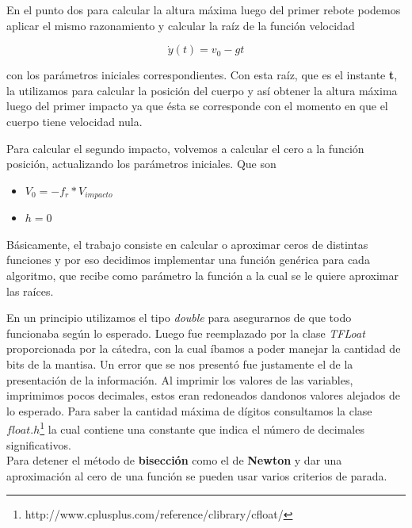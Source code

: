 \documentclass[a4paper]{article}
\begin{document}
En el punto dos para calcular la altura máxima luego del primer rebote podemos aplicar el mismo razonamiento y calcular la raíz de la función velocidad

\begin{equation}
 \dot{y}(t) = v_0 - g t
\end{equation}

con los parámetros iniciales correspondientes. Con esta raíz, que es el instante \textbf{t}, la utilizamos para calcular la posición del cuerpo y así obtener la altura máxima luego del primer impacto ya que ésta se corresponde con el momento en que el cuerpo tiene velocidad nula.\\ \hspace{1em}

Para calcular el segundo impacto, volvemos a calcular el cero a la función posición,  actualizando los parámetros iniciales. Que son 

\begin{itemize}
 	\item $V_0 = -f_r *V_{impacto} $
	\item $h = 0$ 
\end{itemize}

\hspace{1em}

Básicamente, el trabajo consiste en calcular o aproximar ceros de distintas funciones y por eso decidimos implementar una función genérica para cada algoritmo, que recibe como parámetro la función a la cual se le quiere aproximar las raíces. 

En un principio utilizamos el tipo \textit{double} para asegurarnos de que todo funcionaba según lo esperado. Luego fue reemplazado por la clase \textit{TFLoat} proporcionada por la cátedra, con la cual íbamos a poder manejar la cantidad de bits de la mantisa.   
Un error que se nos presentó fue justamente el de la presentación de la información. Al imprimir los valores de las variables, imprimimos pocos decimales, estos eran redoneados dandonos valores alejados de lo esperado. Para saber la cantidad máxima de dígitos consultamos la clase $float.h$\footnote{http://www.cplusplus.com/reference/clibrary/cfloat/} la cual contiene una constante que indica el número de decimales significativos. \\[1em]

Para detener el método de \textbf{bisección} como el de \textbf{Newton} y dar una aproximación al cero de una función se pueden usar varios criterios de parada.
\end{document}
